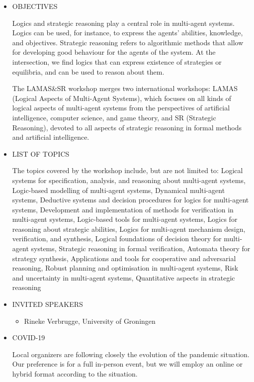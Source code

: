 \documentclass[prodmode,acmtecs]{acmsmall} %
\begin{document}
\begin{itemize}\item  OBJECTIVES   
 
  Logics and strategic reasoning play a central role in multi-agent systems. Logics can be used, for instance, to express the agents’ abilities, knowledge, and objectives. Strategic reasoning refers to algorithmic methods that allow for developing good behaviour for the agents of the system. At the intersection, we find logics that can express existence of strategies or equilibria, and can be used to reason about them. 
 
  The LAMAS\&SR workshop merges two international workshops: LAMAS (Logical Aspects of Multi-Agent Systems), which focuses on all kinds of logical aspects of multi-agent systems from the perspectives of artificial intelligence, computer science, and game theory, and SR (Strategic Reasoning), devoted to all aspects of strategic reasoning in formal methods and artificial intelligence. 
 
\item  LIST OF TOPICS  
 
  The topics covered by the workshop include, but are not limited to: Logical systems for specification, analysis, and reasoning about multi-agent systems, Logic-based modelling of multi-agent systems, Dynamical multi-agent systems, Deductive systems and decision procedures for logics for multi-agent systems, Development and implementation of methods for verification in multi-agent systems, Logic-based tools for multi-agent systems, Logics for reasoning about strategic abilities, Logics for multi-agent mechanism design, verification, and synthesis, Logical foundations of decision theory for multi-agent systems, Strategic reasoning in formal verification, Automata theory for strategy synthesis, Applications and tools for cooperative and adversarial reasoning, Robust planning and optimisation in multi-agent systems, Risk and uncertainty in multi-agent systems, Quantitative aspects in strategic reasoning 
 
\item  INVITED SPEAKERS  
 
\begin{itemize}\item  Rineke Verbrugge, University of Groningen
\end{itemize} 
\item  COVID-19 
 
  Local organizers are following closely the evolution of the pandemic situation. Our preference is for a full in-person event, but we will employ an online or hybrid format according to the situation. 
 

\end{itemize}
\end{document}
